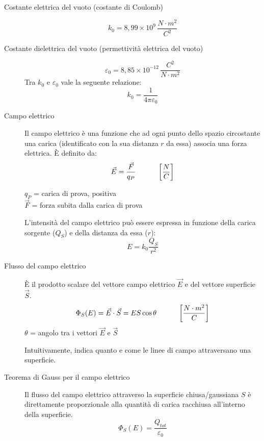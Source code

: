 \documentclass[a4paper,11pt,italian]{article}
\begin{document}
\begin{description}
  \item[Costante elettrica del vuoto (costante di Coulomb)] 
  \[ k_0 = 8,99 \times 10^9 \, \frac{N\cdot m^2}{C^2} \]
  
  \item[Costante dielettrica del vuoto (permettività elettrica del vuoto)]
  \[ \varepsilon_0 = 8,85\times 10^{-12} \, \frac{C^2}{N \cdot m^2} \]
  Tra $ k_0 $ e $ \varepsilon_0 $ vale la seguente relazione:
  \[ k_0 = \frac{1}{4 \pi \varepsilon_0} \]
  

  \item[Campo elettrico] 
  Il campo elettrico è una funzione che ad ogni punto dello spazio circostante una carica (identificato con la sua distanza $ r $ da essa) associa una forza elettrica. 
  È definito da:
  \[ \vec{E}  = \frac{\vec{F}}{q_P} \hspace*{3em} \left[ \frac{N}{C} \right] \]
  \begin{multicols}{2}
  $ q_P $ = carica di prova, positiva\\
  $ \vec{F}  $ = forza subita dalla carica di prova
  \end{multicols}
  
  L'intensità del campo elettrico può essere espressa in funzione della carica sorgente ($ Q_S $) e della distanza da essa ($ r $):
  \[ E = k_0 \frac{Q_S}{r^2}  \]
    
  \item[Flusso del campo elettrico] 
  È il prodotto scalare del vettore campo elettrico $ \vec{E} $ e del vettore superficie $ \vec{S} $.
  \[ \Phi_S(E) = \vec{E} \cdot \vec{S} = ES \cos \theta \hspace*{3em} \left[ \frac{N\cdot m^2}{C} \right] \]
  $ \theta $ = angolo tra i vettori $ \vec{E} $ e $ \vec{S} $
  
  Intuitivamente, indica quanto e come le linee di campo attraversano una superficie.
    
  \item[Teorema di Gauss per il campo elettrico] 
  Il flusso del campo elettrico attraverso la superficie chiusa/gaussiana $ S $ è direttamente proporzionale alla quantità di carica racchiusa all'interno della superficie.
  \[ \Phi_S(E) = \frac{Q_{tot}}{\varepsilon_0} \]
  

\end{description}
\end{document}
